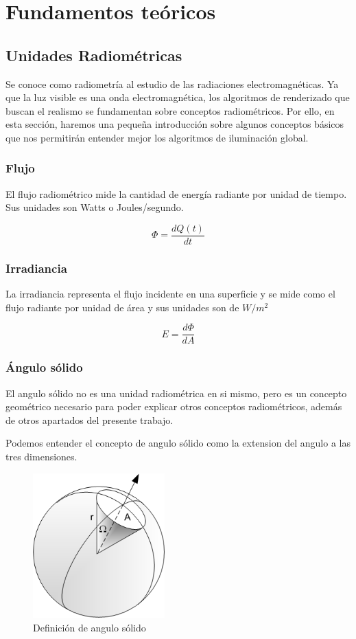 \chapter{Fundamentos teóricos}

\section{Unidades Radiométricas}
Se conoce como radiometría al estudio de las radiaciones electromagnéticas. Ya que la luz visible es una onda electromagnética, los algoritmos de renderizado que buscan el realismo se fundamentan sobre conceptos radiométricos. Por ello, en esta sección, haremos una pequeña introducción sobre algunos conceptos básicos que nos permitirán entender mejor los algoritmos de iluminación global.  
\subsection{Flujo}

El flujo radiométrico mide la cantidad de energía radiante por unidad de tiempo. Sus unidades son Watts o Joules/segundo.

\begin{equation}
\Phi = \frac{dQ(t)}{dt}
\end{equation}

\subsection{Irradiancia}
La irradiancia representa el flujo incidente en una superficie y se mide como el flujo radiante por unidad de área y sus unidades son de $W/m^2$ 

\begin{equation}
E = \frac{d\Phi}{dA}
\end{equation}

\clearpage

\subsection{Ángulo sólido}
El angulo sólido no es una unidad radiométrica en si mismo, pero es un concepto geométrico necesario para poder explicar otros conceptos radiométricos, además de otros apartados del presente trabajo.

Podemos entender el concepto de angulo sólido como la extension del angulo a las tres dimensiones.
\begin{figure}[h]
\centering
\includegraphics[width=2in]{Solid_Angle.png}
\caption{Definición de angulo sólido \cite{Haade}}
\end{figure}

